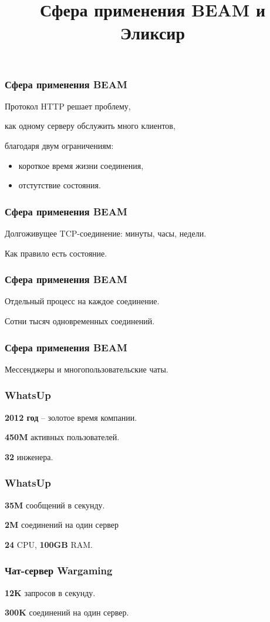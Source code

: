 \documentclass[10pt,xcolor=x11names]{beamer}
\title{Сфера применения BEAM и Эликсир}
\begin{document}
\begin{frame}
  \frametitle{Сфера применения BEAM}
  Протокол HTTP решает проблему,
  \par \bigskip
  как одному серверу обслужить много клиентов,
  \par \bigskip
  благодаря двум ограничениям:
  \par \bigskip
  \begin{itemize}
    \item короткое время жизни соединения,
    \item отстутствие состояния.
  \end{itemize}
\end{frame}

\begin{frame}
  \frametitle{Сфера применения BEAM}
  Долгоживущее TCP-соединение: минуты, часы, недели.
  \par \bigskip
  Как правило есть состояние.
\end{frame}

\begin{frame}
  \frametitle{Сфера применения BEAM}
  Отдельный процесс на каждое соединение.
  \par \bigskip
  Сотни тысяч одновременных соединений.
\end{frame}

\begin{frame}
  \frametitle{Сфера применения BEAM}
  Мессенджеры и многопользовательские чаты.
\end{frame}

\begin{frame}
  \frametitle{WhatsUp}
  \textbf{2012 год} -- золотое время компании.
  \par \bigskip
  \textbf{450M} активных пользователей.
  \par \bigskip
  \textbf{32} инженера.
\end{frame}

\begin{frame}
  \frametitle{WhatsUp}
  \textbf{35M} сообщений в секунду.
  \par \bigskip
  \textbf{2M} соединений на один сервер
  \par \bigskip
  \textbf{24} CPU, \textbf{100GB} RAM.
\end{frame}

\begin{frame}
  \frametitle{Чат-сервер Wargaming}
  \textbf{12K} запросов в секунду.
  \par \bigskip
  \textbf{300K} соединений на один сервер.
\end{frame}
\end{document}
